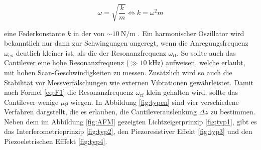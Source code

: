 \begin{equation}
  \omega = \sqrt{\frac{k}{m}}
  \iff
  k = \omega^2 m
  \label{eq:F1}
\end{equation}

\noindent
eine Federkonstante $k$ in der von $\sim\SI{10}{\newton\per\meter}$ \cite[157]{AFM}.
Ein harmonischer Oszillator wird bekanntlich nur dann zur Schwingungen angeregt,
wenn die Anregungsfrequenz $\omega_{\text{ex}}$ deutlich kleiner ist, als die
der Resonanzfrequenz $\omega_{\text{rf}}$. So sollte auch das Cantilever eine
hohe Resonanzfrequenz ($\gg \SI{10}{\kilo\hertz}$) aufweisen, welche erlaubt,
mit hohen Scan-Geschwindigkeiten zu messen. Zusätzlich wird so auch die Stabilität
vor Messverfälschungen wie externen Vibrationen gewährleistet. Damit nach Formel \ref{eq:F1}
die Resonanzfrequenz $\omega_{\text{rf}}$ klein gehalten wird, sollte das
Cantilever wenige $\mu g$ wiegen. In Abbildung \ref{fig:typen} sind vier verschiedene
Verfahren dargstellt, die es erlauben, die Cantileverauslenkung $\Delta z$ zu bestimmen.
Neben dem im Abbildung \ref{fig:AFM} gezeigten Lichtzeigerprinzip \ref{fig:typ1},
gibt es das Interferometrieprinzip \ref{fig:typ2}, den Piezoresistiver Effekt
\ref{fig:typ3} und den Piezoeletrischen Efffekt \ref{fig:typ4}.



